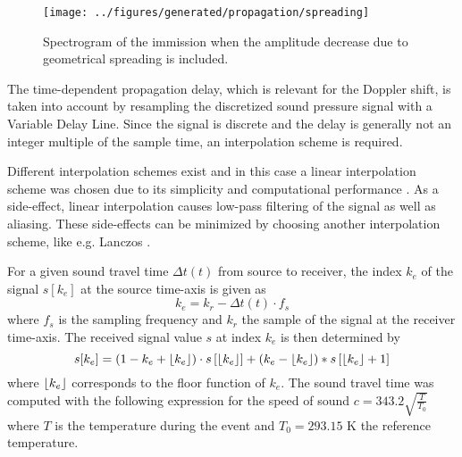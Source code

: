\begin{figure}[H]
  \centering
  \texttt{[image: ../figures/generated/propagation/spreading]}
  \caption{Spectrogram of the immission when the amplitude decrease due to geometrical spreading is included.}
  \label{fig:implementation:propagation:spreading}
\end{figure}

The time-dependent propagation delay, which is relevant for the Doppler shift,
is taken into account by resampling the discretized sound pressure signal with a
Variable Delay Line. Since the signal is discrete and the delay is generally not
an integer multiple of the sample time, an interpolation scheme is required.

Different interpolation schemes exist and in this case a linear interpolation
scheme was chosen due to its simplicity and computational performance \cite{Heutschi2014}.
As a side-effect, linear interpolation causes low-pass filtering of the signal as
well as aliasing. These side-effects can be minimized by choosing another
interpolation scheme, like e.g. Lanczos \cite{Rietdijk2015, Pieren2015}.


For a given sound travel time $\Delta t(t)$ from source to receiver, the index
$k_{e}$ of the signal $s[k_e]$ at the source time-axis is given as
\begin{equation}
 k_{e} = k_r - \Delta t (t) \cdot f_s
\end{equation}
where $f_s$ is the sampling frequency and $k_r$ the sample of the signal at the
receiver time-axis. The received signal value $s$ at index $k_e$ is then
determined by
\begin{equation}
 s[k_e] = \left( 1 - k_e +  \lfloor k_e\rfloor \right) \cdot s \left[ \lfloor k_e\rfloor \right] + \left( k_e - \lfloor k_e\rfloor \right) * s \left[ \lfloor k_e\rfloor + 1 \right]
\end{equation}
where $\lfloor k_e\rfloor$ corresponds to the floor function of $k_e$.
The sound travel time was computed with the following expression for the speed of sound $c = 343.2 \sqrt{ \frac{T}{T_0} }$
where $T$ is the temperature during the event and $T_0 = 293.15$ K the reference temperature.

